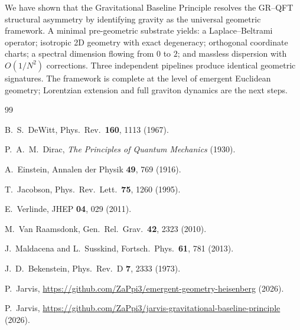 \documentclass[aps,prd,twocolumn,nofootinbib,superscriptaddress]{revtex4-2}
\begin{document}
We have shown that the Gravitational Baseline Principle resolves the GR--QFT structural asymmetry by identifying gravity as the universal geometric framework. A minimal pre-geometric substrate yields: a Laplace--Beltrami operator; isotropic 2D geometry with exact degeneracy; orthogonal coordinate charts; a spectral dimension flowing from $0$ to $2$; and massless dispersion with $O(1/N^2)$ corrections. Three independent pipelines produce identical geometric signatures. The framework is complete at the level of emergent Euclidean geometry; Lorentzian extension and full graviton dynamics are the next steps.

\begin{thebibliography}{99}

B.~S.~DeWitt, Phys.\ Rev.\ \textbf{160}, 1113 (1967).

P.~A.~M.~Dirac, \emph{The Principles of Quantum Mechanics} (1930).

A.~Einstein, Annalen der Physik \textbf{49}, 769 (1916).

T.~Jacobson, Phys.\ Rev.\ Lett.\ \textbf{75}, 1260 (1995).

E.~Verlinde, JHEP \textbf{04}, 029 (2011).

M.~Van Raamsdonk, Gen.\ Rel.\ Grav.\ \textbf{42}, 2323 (2010).

J.~Maldacena and L.~Susskind, Fortsch.\ Phys.\ \textbf{61}, 781 (2013).

J.~D.~Bekenstein, Phys.\ Rev.\ D \textbf{7}, 2333 (1973).

P.~Jarvis, \url{https://github.com/ZaPpi3/emergent-geometry-heisenberg} (2026).

P.~Jarvis, \url{https://github.com/ZaPpi3/jarvis-gravitational-baseline-principle} (2026).

\end{thebibliography}
\end{document}
